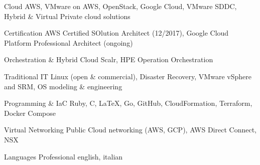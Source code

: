 
\begin{cvskills}

  \cvskill
    {Cloud} %
    {AWS, VMware on AWS, OpenStack, Google Cloud, VMware SDDC, Hybrid \& Virtual Private cloud solutions} %

  \cvskill
    {Certification} %
    {AWS Certified SOlution Architect (12/2017), Google Cloud Platform Professional Architect (ongoing)}

  \cvskill
    {Orchestration \& Hybrid Cloud} %
    {Scalr, HPE Operation Orchestration}

  \cvskill
    {Traditional IT} %
    {Linux (open \& commercial), Disaster Recovery, VMware vSphere and SRM, OS modeling \& engineering} %

  \cvskill
    {Programming \& IaC} %
    {Ruby, C, \LaTeX, Go, GitHub, CloudFormation, Terraform, Docker Compose} %

  \cvskill
    {Virtual Networking} %
    {Public Cloud networking (AWS, GCP), AWS Direct Connect, NSX}

  \cvskill
    {Languages} %
    {Professional english, italian} %

\end{cvskills}
